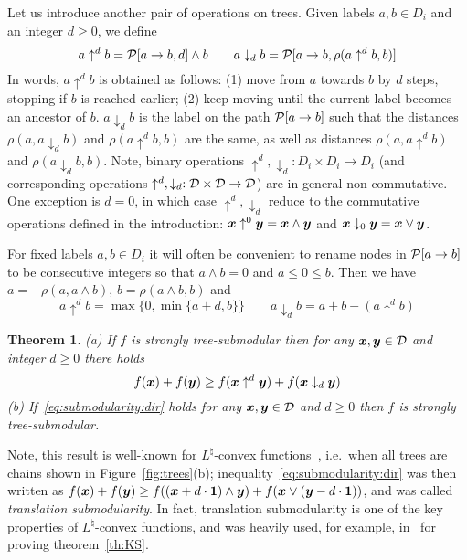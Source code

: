 \documentclass[11pt,onecolumn]{article}
\newtheorem{theorem}{Theorem}
\def\D{{\cal D}}
\def\calP{{\cal P}}
\newcommand{\bx}{\mbox{\boldmath $x$}}
\newcommand{\by}{\mbox{\boldmath $y$}}
\begin{document}
Let us introduce another pair of operations on trees. 
Given labels $a,b\in D_i$ and an integer $d\ge 0$, we define 
$$
a \uparrow^d b   = \calP[a\rightarrow b,d]\wedge b \qquad
a \downarrow_d b = \calP[a\rightarrow b,\rho(a \uparrow^d b,b)]
$$
In words, $a \uparrow^d b$ is obtained as follows: (1) move from $a$ towards $b$ by $d$ steps,
stopping if $b$ is reached earlier; (2) keep moving until the current label becomes an ancestor of $b$.
$a \downarrow_d b$ is the label on the path $\calP[a\rightarrow b]$ such that the distances
$\rho(a,a \downarrow_d b)$ and $\rho(a \uparrow^d b,b)$ are the same,
as well as distances $\rho(a,a \uparrow^d b)$ and $\rho(a \downarrow_d b,b)$.
Note, binary operations $\uparrow^d,\downarrow_d:D_i\times D_i\rightarrow D_i$ 
(and corresponding operations $\uparrow^d,\downarrow_d:\D\times \D\rightarrow \D$) are in general non-commutative.
One exception is $d=0$, in which case  $\uparrow^d,\downarrow_d$ reduce to the commutative
operations defined in the introduction: $\bx\uparrow^0\by=\bx\wedge\by$ and $\bx\downarrow_0\by=\bx\vee\by$.

For fixed labels $a,b\in D_i$ it will often be convenient to rename nodes in $\calP[a\rightarrow b]$ to be
consecutive integers so that $a\wedge b=0$ and $a\le 0\le b$. Then we have $a=-\rho(a,a\wedge b)$, $b=\rho(a\wedge b,b)$ and
$$
a \uparrow^d b = \max\{0,\min\{ a+d,b \}\} \qquad
a \downarrow_d b = a + b - (a \uparrow^d b)
$$

\begin{theorem} (a) If $f$ is strongly tree-submodular then for any $\bx, \by\in \D$ and integer $d\ge 0$ there holds
{\em
\begin{equation}
f(\bx)+f(\by)\ge f(\bx \uparrow^d \by) + f(\bx \downarrow_d \by)
\label{eq:submodularity:dir}
\end{equation}
\em }
(b) If~\eqref{eq:submodularity:dir} holds for any $\bx, \by\in \D$ and $d\ge 0$ then $f$ is strongly tree-submodular.
\label{th:submodularity:dir}
\end{theorem}

Note, this result is well-known for $L^\natural$-convex functions~\cite[section 7.1]{Murota:book},
i.e.\ when all trees are chains shown in Figure~\ref{fig:trees}(b); inequality~\eqref{eq:submodularity:dir} was then written as 
$f(\bx)+f(\by)\ge f((\bx+d \cdot{\bf 1})\wedge \by) + f(\bx\vee (\by- d \cdot{\bf 1}))$, and was called {\em translation submodularity}.
In fact, translation submodularity is one of the key properties of $L^\natural$-convex functions, and was heavily used, for example, in~\cite{KS:09}
for proving theorem~\ref{th:KS}.
\end{document}
